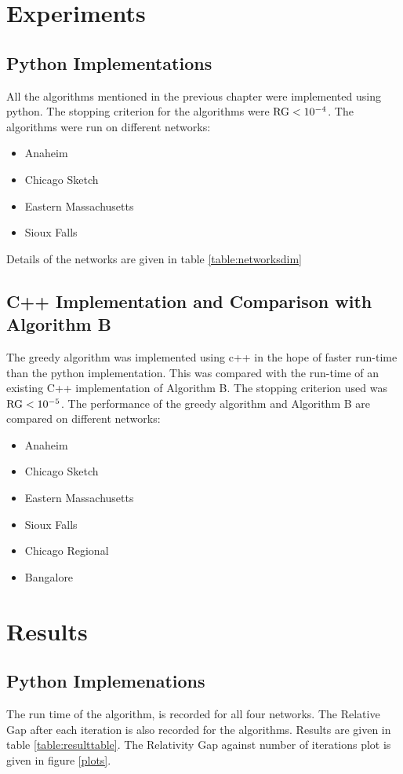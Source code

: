 \section{Experiments}

\subsection{Python Implementations}
All the algorithms mentioned in the previous chapter were implemented
using python. The stopping criterion for the algorithms were
$\hbox{RG}<10^{-4}$. The algorithms were run on different networks:

\begin{itemize}
	\item Anaheim
	\item Chicago Sketch
	\item Eastern Massachusetts
	\item Sioux Falls
\end{itemize}

Details of the networks are given in table \ref{table:networksdim}


\subsection{C++ Implementation and Comparison with Algorithm B}
The greedy algorithm was implemented using c++ in the hope of
faster run-time than the python implementation. This was compared
with the run-time of an existing C++ implementation of Algorithm B.
The stopping criterion used was $\hbox{RG}<10^{-5}$.
The performance of the greedy algorithm and Algorithm B are compared
on different networks:

\begin{itemize}
	\item Anaheim
	\item Chicago Sketch
	\item Eastern Massachusetts
	\item Sioux Falls
	\item Chicago Regional
	\item Bangalore
\end{itemize}





\section{Results}
\subsection{Python Implemenations}
The run time of the algorithm, is recorded for all four networks.
The Relative Gap after each iteration is also recorded for the algorithms.
Results are given in table \ref{table:resulttable}. The Relativity Gap
against number of iterations plot is given in figure \ref{plots}.


